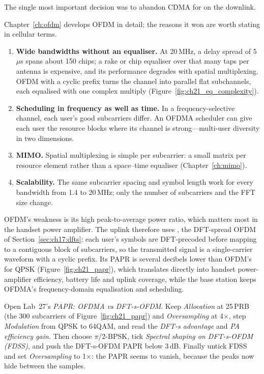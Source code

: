 The single most important decision was to abandon CDMA for  on the downlink.

Chapter~\ref{ch:ofdm} develops OFDM in detail; the reasons it won are worth stating in cellular
terms.
\begin{enumerate}
\item \textbf{Wide bandwidths without an equaliser.} At 20\,MHz, a delay spread of 5\,$\mu$s spans
about 150 chips; a rake or chip equaliser over that many taps per antenna is expensive, and its
performance degrades with spatial multiplexing. OFDM with a cyclic prefix turns the channel into
parallel flat subchannels, each equalised with one complex multiply
(Figure~\ref{fig:ch21_eq_complexity}).
\item \textbf{Scheduling in frequency as well as time.} In a frequency-selective channel, each user's
good subcarriers differ. An OFDMA scheduler can give each user the resource blocks where its channel
is strong---multi-user diversity in two dimensions.
\item \textbf{MIMO.} Spatial multiplexing is simple per subcarrier: a small matrix per resource
element rather than a space--time equaliser (Chapter~\ref{ch:mimo}).
\item \textbf{Scalability.} The same subcarrier spacing and symbol length work for every bandwidth
from 1.4 to 20\,MHz; only the number of subcarriers and the FFT size change.
\end{enumerate}

OFDM's weakness is its high peak-to-average power ratio, which matters most in the handset power
amplifier. The uplink therefore uses , the DFT-spread OFDM of
Section~\ref{sec:ch17:dfts}: each user's symbols are DFT-precoded before mapping to a contiguous
block of subcarriers, so the transmitted signal is a single-carrier waveform with a cyclic prefix.
Its PAPR is several decibels lower than OFDM's for QPSK (Figure~\ref{fig:ch21_papr}), which
translates directly into handset power-amplifier efficiency, battery life and uplink coverage, while
the base station keeps OFDMA's frequency-domain equalisation and scheduling.

\begin{tryit}
Open Lab~27's \emph{PAPR: OFDMA vs DFT-s-OFDM}. Keep \emph{Allocation} at 25\,PRB (the 300
subcarriers of Figure~\ref{fig:ch21_papr}) and \emph{Oversampling} at 4$\times$, step
\emph{Modulation} from QPSK to 64QAM, and read the \emph{DFT-s advantage} and \emph{PA efficiency
gain}. Then choose $\pi$/2-BPSK, tick \emph{Spectral shaping on DFT-s-OFDM (FDSS)}, and push the
DFT-s-OFDM PAPR below 3\,dB. Finally untick FDSS and set \emph{Oversampling} to 1$\times$: the PAPR seems
to vanish, because the peaks now hide between the samples.
\end{tryit}

